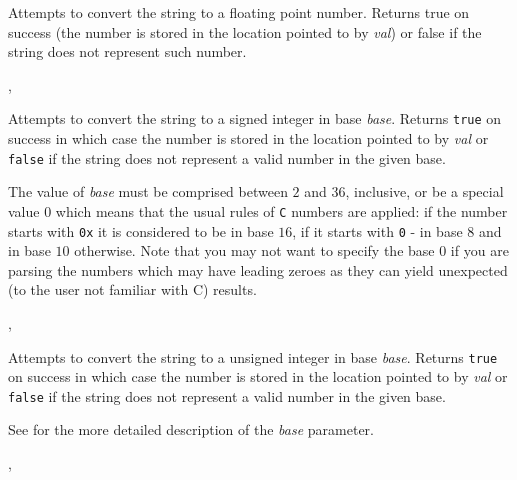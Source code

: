 Attempts to convert the string to a floating point number. Returns true on
success (the number is stored in the location pointed to by {\it val}) or false
if the string does not represent such number.


,\\

\label{wxstringtolong}


Attempts to convert the string to a signed integer in base {\it base}. Returns
{\tt true} on success in which case the number is stored in the location
pointed to by {\it val} or {\tt false} if the string does not represent a
valid number in the given base.

The value of {\it base} must be comprised between $2$ and $36$, inclusive, or
be a special value $0$ which means that the usual rules of {\tt C} numbers are
applied: if the number starts with {\tt 0x} it is considered to be in base
$16$, if it starts with {\tt 0} - in base $8$ and in base $10$ otherwise. Note
that you may not want to specify the base $0$ if you are parsing the numbers
which may have leading zeroes as they can yield unexpected (to the user not
familiar with C) results.


,\\

\label{wxstringtoulong}


Attempts to convert the string to a unsigned integer in base {\it base}.
Returns {\tt true} on success in which case the number is stored in the
location pointed to by {\it val} or {\tt false} if the string does not
represent a valid number in the given base.

See  for the more detailed
description of the {\it base} parameter.


,\\

